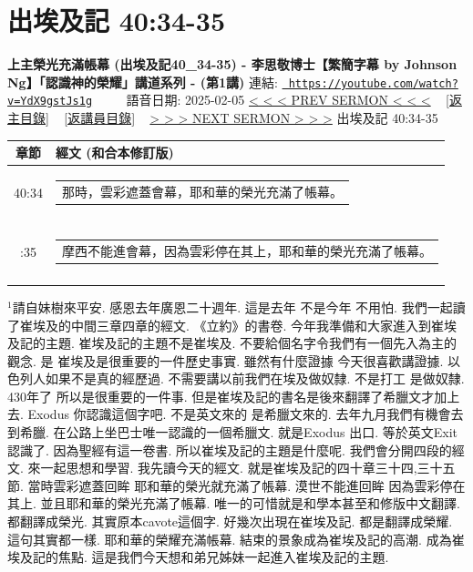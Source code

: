 \documentclass{book}
\begin{document}
\section{出埃及記 40:34-35}
\label{sec:YdX9gstJs1g}
\textbf{上主榮光充滿帳幕 (出埃及記40\_34-35) - 李思敬博士【繁簡字幕 by Johnson Ng】「認識神的榮耀」講道系列 - (第1講)}
\newline
\newline
連結: \href{https://youtube.com/watch?v=YdX9gstJs1g}{\texttt{ https://youtube.com/watch?v=YdX9gstJs1g}} ~~~~ 語音日期: 2025-02-05 
\newline
\newline
\hyperref[sec:dX_CJYSfYFI]{< < < PREV SERMON < < <}
~
\hyperlink{toc}{[返主目錄]}
~
\hyperref[ch:preacher5]{[返講員目錄]}
~
\hyperref[sec:l8BFPdIOADs]{> > > NEXT SERMON > > >}
\newline
\newline
出埃及記 40:34-35
\newline
\begin{longtable}{cl}
\hline
\hline
章節 & 經文 (和合本修訂版)\\
\hline
40:34 & \begin{tabularx}{0.7\textwidth}{X} 那時，雲彩遮蓋會幕，耶和華的榮光充滿了帳幕。 \end{tabularx} \\ \\ \relax
40:35 & \begin{tabularx}{0.7\textwidth}{X} 摩西不能進會幕，因為雲彩停在其上，耶和華的榮光充滿了帳幕。 \end{tabularx} \\ \\
[1ex]
\hline
\hline
\end{longtable}
$^{1}$請自妹樹來平安.
感恩去年廣恩二十週年.
這是去年 不是今年 不用怕.
我們一起讀了崔埃及的中間三章四章的經文.
《立約》的書卷.
今年我準備和大家進入到崔埃及記的主題.
崔埃及記的主題不是崔埃及.
不要給個名字令我們有一個先入為主的觀念.
是 崔埃及是很重要的一件歷史事實.
雖然有什麼證據 今天很喜歡講證據.
以色列人如果不是真的經歷過.
不需要講以前我們在埃及做奴隸.
不是打工 是做奴隸.
430年了 所以是很重要的一件事.
但是崔埃及記的書名是後來翻譯了希臘文才加上去.
Exodus 你認識這個字吧.
不是英文來的 是希臘文來的.
去年九月我們有機會去到希臘.
在公路上坐巴士唯一認識的一個希臘文.
就是Exodus 出口.
等於英文Exit 認識了.
因為聖經有這一卷書.
所以崔埃及記的主題是什麼呢.
我們會分開四段的經文.
來一起思想和學習.
我先讀今天的經文.
就是崔埃及記的四十章三十四,三十五節.
當時雲彩遮蓋回眸 耶和華的榮光就充滿了帳幕.
漠世不能進回眸 因為雲彩停在其上.
並且耶和華的榮光充滿了帳幕.
唯一的可惜就是和學本甚至和修版中文翻譯.
都翻譯成榮光.
其實原本cavote這個字.
好幾次出現在崔埃及記.
都是翻譯成榮耀.
這句其實都一樣.
耶和華的榮耀充滿帳幕.
結束的景象成為崔埃及記的高潮.
成為崔埃及記的焦點.
這是我們今天想和弟兄姊妹一起進入崔埃及記的主題.
\end{document}
